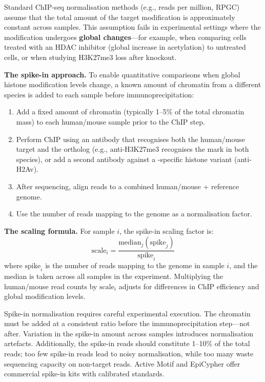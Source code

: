 Standard ChIP-seq normalisation methods (e.g., reads per million, RPGC) assume that the total amount of the target modification is approximately constant across samples. This assumption fails in experimental settings where the modification undergoes \textbf{global changes}---for example, when comparing cells treated with an HDAC inhibitor (global increase in acetylation) to untreated cells, or when studying H3K27me3 loss after  knockout.

\textbf{The spike-in approach.} To enable quantitative comparisons when global histone modification levels change, a known amount of chromatin from a different species is added to each sample before immunoprecipitation:

\begin{enumerate}[itemsep=2pt]
  \item Add a fixed amount of  chromatin (typically 1--5\% of the total chromatin mass) to each human/mouse sample prior to the ChIP step.
  \item Perform ChIP using an antibody that recognises both the human/mouse target and the  ortholog (e.g., anti-H3K27me3 recognises the mark in both species), or add a second antibody against a -specific histone variant (anti-H2Av).
  \item After sequencing, align reads to a combined human/mouse +  reference genome.
  \item Use the number of reads mapping to the  genome as a normalisation factor.
\end{enumerate}

\textbf{The scaling formula.} For sample $i$, the spike-in scaling factor is:
\begin{equation}
\label{eq:histones:spikein-scale}
\text{scale}_i = \frac{\text{median}_{j}(\text{spike}_j)}{\text{spike}_i}
\end{equation}
where $\text{spike}_i$ is the number of reads mapping to the  genome in sample $i$, and the median is taken across all samples in the experiment. Multiplying the human/mouse read counts by $\text{scale}_i$ adjusts for differences in ChIP efficiency and global modification levels.

\begin{warningbox}
Spike-in normalisation requires careful experimental execution. The  chromatin must be added at a consistent ratio before the immunoprecipitation step---not after. Variation in the spike-in amount across samples introduces normalisation artefacts. Additionally, the spike-in reads should constitute 1--10\% of the total reads; too few spike-in reads lead to noisy normalisation, while too many waste sequencing capacity on non-target reads. Active Motif and EpiCypher offer commercial spike-in kits with calibrated standards.
\end{warningbox}

